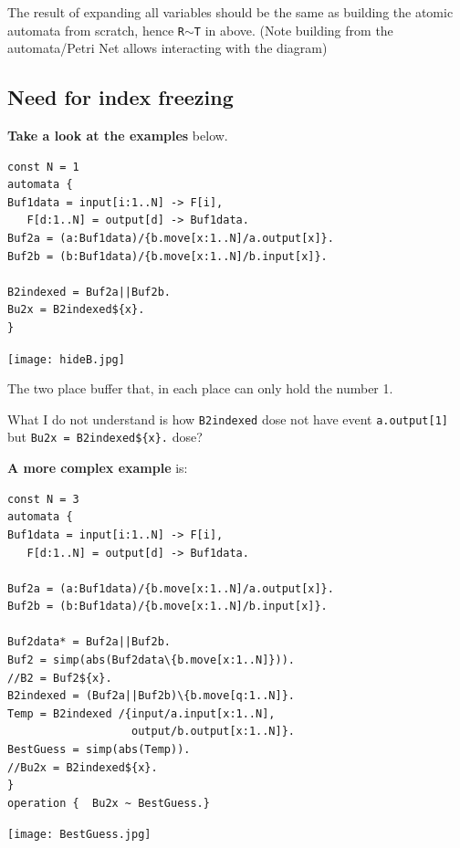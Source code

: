 \documentclass[]{article}
\begin{document}
The result of expanding all variables should be the same as building the atomic automata from  scratch, hence \verb|R|$\sim$\verb|T| in above. (Note building from the automata/Petri Net allows interacting with the diagram)




\subsection{Need for index freezing }
{\color{red}

\begin{minipage}{0.55\textwidth}
{\bf Take a look at the examples} below.

\begin{verbatim}
const N = 1
automata {
Buf1data = input[i:1..N] -> F[i],
   F[d:1..N] = output[d] -> Buf1data.
Buf2a = (a:Buf1data)/{b.move[x:1..N]/a.output[x]}.
Buf2b = (b:Buf1data)/{b.move[x:1..N]/b.input[x]}.

B2indexed = Buf2a||Buf2b.
Bu2x = B2indexed${x}.
}
   \end{verbatim}
\end{minipage}\begin{minipage}{0.35\textwidth}
\begin{center}\texttt{[image: hideB.jpg]}\end{center}
\end{minipage}

The two place buffer that, in each place can only hold the number 1.

What I do not understand is how \verb|B2indexed| dose not have event  \verb|a.output[1]| but
\verb|Bu2x = B2indexed${x}.| dose?



{\bf A more complex example} is:

\begin{minipage}{0.55\textwidth}
\begin{verbatim}
const N = 3
automata {
Buf1data = input[i:1..N] -> F[i],
   F[d:1..N] = output[d] -> Buf1data.

Buf2a = (a:Buf1data)/{b.move[x:1..N]/a.output[x]}.
Buf2b = (b:Buf1data)/{b.move[x:1..N]/b.input[x]}.

Buf2data* = Buf2a||Buf2b.
Buf2 = simp(abs(Buf2data\{b.move[x:1..N]})).
//B2 = Buf2${x}.
B2indexed = (Buf2a||Buf2b)\{b.move[q:1..N]}.
Temp = B2indexed /{input/a.input[x:1..N],
                   output/b.output[x:1..N]}.
BestGuess = simp(abs(Temp)).
//Bu2x = B2indexed${x}.
}
operation {  Bu2x ~ BestGuess.}
   \end{verbatim}
\end{minipage}\begin{minipage}{0.4\textwidth}
\begin{center}\texttt{[image: BestGuess.jpg]}


\end{center}
\end{minipage}}
\end{document}
